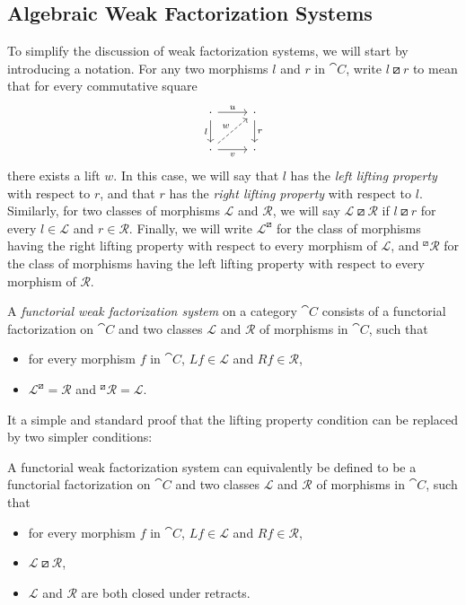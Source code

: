\subsection{Algebraic Weak Factorization Systems}

To simplify the discussion of weak factorization systems, we will start by introducing a notation. For any two morphisms $l$ and $r$ in $\cat{C}$, write $l\boxslash r$ to mean that for every commutative square
\begin{equation}\label{Eq:LiftingSquare}
\begin{tikzcd}
	\cdot \rar{u} \dar[swap]{l} & \cdot \dar{r} \\
	\cdot \rar[swap]{v} \urar[dashed]{w} & \cdot
\end{tikzcd}
\end{equation}
there exists a lift $w$. In this case, we will say that $l$ has the \emph{left lifting property} with respect to $r$, and that $r$ has the \emph{right lifting property} with respect to $l$. Similarly, for two classes of morphisms $\mathcal{L}$ and $\mathcal{R}$, we will say $\mathcal{L}\boxslash\mathcal{R}$ if $l\boxslash r$ for every $l\in\mathcal{L}$ and $r\in\mathcal{R}$. Finally, we will write $\mathcal{L}^{\boxslash}$ for the class of morphisms having the right lifting property with respect to every morphism of $\mathcal{L}$, and ${}^{\boxslash}\!\mathcal{R}$ for the class of morphisms having the left lifting property with respect to every morphism of $\mathcal{R}$.

\begin{definition}
	A \emph{functorial weak factorization system} on a category $\cat{C}$ consists of a functorial factorization on $\cat{C}$ and two classes $\mathcal{L}$ and $\mathcal{R}$ of morphisms in $\cat{C}$, such that
	\begin{itemize}
		\item for every morphism $f$ in $\cat{C}$, $Lf\in\mathcal{L}$ and $Rf\in\mathcal{R}$,
		\item $\mathcal{L}^{\boxslash}=\mathcal{R}$ and ${}^{\boxslash}\!\mathcal{R}=\mathcal{L}$.
	\end{itemize}
\end{definition}

It a simple and standard proof that the lifting property condition can be replaced by two simpler conditions:

\begin{lemma}
	A functorial weak factorization system can equivalently be defined to be a functorial factorization on $\cat{C}$ and two classes $\mathcal{L}$ and $\mathcal{R}$ of morphisms in $\cat{C}$, such that
	\begin{itemize}
		\item for every morphism $f$ in $\cat{C}$, $Lf\in\mathcal{L}$ and $Rf\in\mathcal{R}$,
		\item $\mathcal{L}\boxslash\mathcal{R}$,
		\item $\mathcal{L}$ and $\mathcal{R}$ are both closed under retracts.
	\end{itemize}
\end{lemma}

